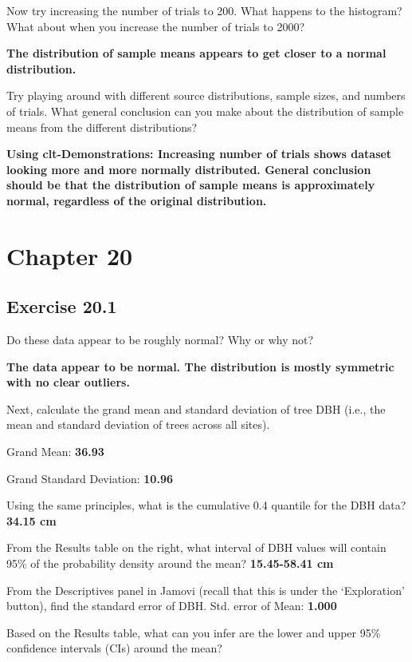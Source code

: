 \documentclass[
  openany]{scrbook}
\begin{document}
Now try increasing the number of trials to 200. What happens to the histogram? What about when you increase the number of trials to 2000?

\textbf{The distribution of sample means appears to get closer to a normal distribution.}

Try playing around with different source distributions, sample sizes, and numbers of trials. What general conclusion can you make about the distribution of sample means from the different distributions?

\textbf{Using clt-Demonstrations: Increasing number of trials shows dataset looking more and more normally distributed. General conclusion should be that the distribution of sample means is approximately normal, regardless of the original distribution.}

\hypertarget{chapter-20}{%
\section{Chapter 20}\label{chapter-20}}

\hypertarget{exercise-20.1}{%
\subsection{Exercise 20.1}\label{exercise-20.1}}

Do these data appear to be roughly normal? Why or why not?

\textbf{The data appear to be normal. The distribution is mostly symmetric with no clear outliers.}

Next, calculate the grand mean and standard deviation of tree DBH (i.e., the mean and standard deviation of trees across all sites).

Grand Mean: \textbf{36.93}

Grand Standard Deviation: \textbf{10.96}

Using the same principles, what is the cumulative 0.4 quantile for the DBH data? \textbf{34.15 cm}

From the Results table on the right, what interval of DBH values will contain 95\% of the probability density around the mean? \textbf{15.45-58.41 cm}

From the Descriptives panel in Jamovi (recall that this is under the `Exploration'
button), find the standard error of DBH. Std. error of Mean: \textbf{1.000}

Based on the Results table, what can you infer are the lower and upper 95\%
confidence intervals (CIs) around the mean?
\end{document}
